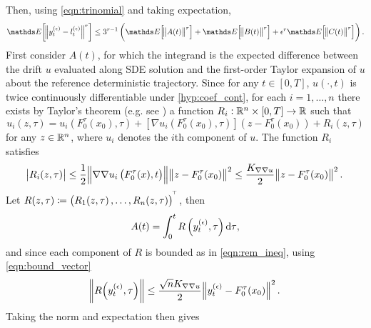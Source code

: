 Then, using \cref{eqn:trinomial} and taking expectation,
\begin{equation}
	\avg{\norm{y_t^{(\epsilon)} - l_t^{(\epsilon)}}^r} \leq 3^{r-1}\left(\avg{\norm{A(t)}^r} + \avg{\norm{B(t)}^r} + \epsilon^r\avg{\norm{C(t)}^r}\right) .
	\label{eqn:diff_decomp}
\end{equation}
First consider \(A(t)\), for which the integrand is the expected difference between the drift \(u\) evaluated along SDE solution and the first-order Taylor expansion of \(u\) about the reference deterministic trajectory.
Since for any \(t \in [0,T]\), \(u\left(\cdot, t\right)\) is twice continuously differentiable under \ref{hyp:coef_cont}, for each \(i = 1,\hdots,n\) there exists by Taylor's theorem (e.g. see \citet[Cor. A9.3.]{HubbardHubbard_2009_VectorCalculusLinear}) a function \(R_i: \mathbb{R}^n \times [0,T] \to \mathbb{R}\) such that
\begin{equation}
	u_i\!\left(z, \tau\right) = u_i\!\left(F_0^\tau\!\left(x_0\right), \tau\right) + \left[\nabla u_i\left(F_0^\tau\!\left(x_0\right), \tau\right)\right]\left(z - F_0^\tau\!\left(x_0\right)\right) + R_i\!\left(z, \tau\right)
	\label{eqn:taylor_expan}
\end{equation}
for any \(z \in \mathbb{R}^n\), where \(u_i\) denotes the \(i\)th component of \(u\).
The function \(R_i\) satisfies
\begin{equation}
	\abs{R_i(z, \tau)} \leq \frac12\norm{\nabla\nabla u_i\left(F_0^\tau(x), t\right)}\norm{z - F_0^\tau\!\left(x_0\right)}^2 \leq \frac{K_{\nabla\nabla u}}{2}\norm{z - F_0^\tau\!\left(x_0\right)}^2.
	\label{eqn:rem_ineq}
\end{equation}
Let \(R\!\left(z, \tau\right) \coloneqq \left( R_1\!\left(z, \tau\right), \hdots, R_n\!\left(z, \tau\right)\right)^{^{\!\top}}\), then
\[
	A(t) = \int_0^t{R\left(y_{t}^{(\epsilon)}, \tau\right)\dif\tau},
\]
and since each component of \(R\) is bounded as in \cref{eqn:rem_ineq}, using \cref{eqn:bound_vector}
\[
	\norm{R\!\left(y_t^{(\epsilon)}, \tau\right)} \leq \frac{\sqrt{n} K_{\nabla\nabla u}}{2}\norm{y_t^{(\epsilon)} - F_0^\tau\!\left(x_0\right)}^2.
\]
Taking the norm and expectation then gives
